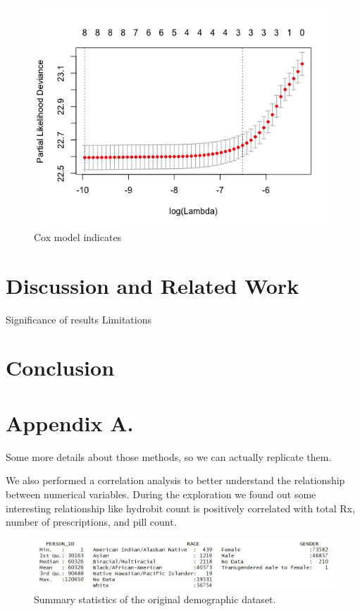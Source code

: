 \documentclass[twoside,10.5pt]{article}
\begin{document}
\begin{figure}[htp]
\centering
\includegraphics[width=12cm]{images/Coxmodel.png}
\caption{Cox model indicates}
\label{fig:lion}
\end{figure}

\section{Discussion and Related Work}
Significance of results
Limitations 

\section{Conclusion}

\newpage
\appendix
\section*{Appendix A.}
Some more details about those methods, so we can actually replicate them.

We also performed a correlation analysis to better understand the relationship between numerical variables. During the exploration we found out some interesting relationship like hydrobit count is positively correlated with total Rx, number of prescriptions, and pill count.

\begin{figure}
\begin{center}
\includegraphics[width=5in]{original_dem_summary.JPG}
\end{center}
\caption{Summary statistics of the original demographic dataset.}
\label{fig:orig_dem}
\end{figure}
\end{document}
